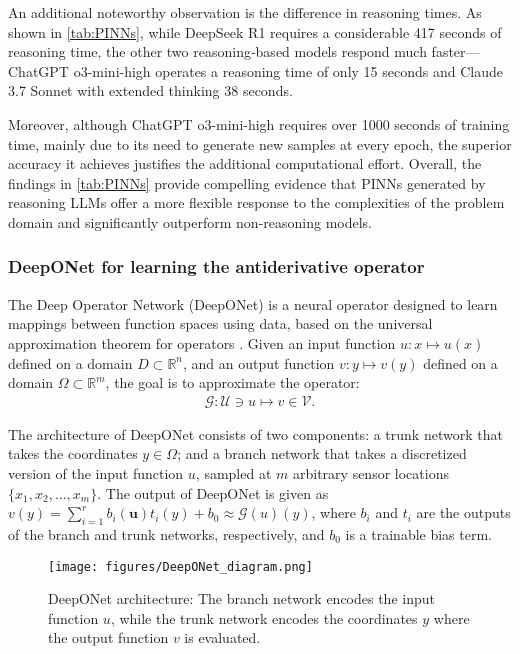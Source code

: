 \documentclass{article}
\begin{document}
An additional noteworthy observation is the difference in reasoning times. As shown in \autoref{tab:PINNs}, while DeepSeek R1 requires a considerable 417 seconds of reasoning time, the other two reasoning‐based models respond much faster—ChatGPT o3-mini-high operates a reasoning time of only 15 seconds and Claude 3.7 Sonnet with extended thinking 38 seconds. 

Moreover, although ChatGPT o3-mini-high requires over 1000 seconds of training time, mainly due to its need to generate new samples at every epoch, the superior accuracy it achieves justifies the additional computational effort. Overall, the findings in \autoref{tab:PINNs} provide compelling evidence that PINNs generated by reasoning LLMs offer a more flexible response to the complexities of the problem domain and significantly outperform non-reasoning models.



\subsubsection{DeepONet for learning the antiderivative operator}

The Deep Operator Network (DeepONet) \cite{deeponet} is a neural operator designed to learn mappings between function spaces using data, based on the universal approximation theorem for operators \cite{chen_universal_thm_neural_operator}. Given an input function $ u: x \mapsto u(x) $ defined on a domain $ D \subset \mathbb{R}^n $, and an output function $ v: y \mapsto v(y) $ defined on a domain $ \Omega \subset \mathbb{R}^m $, the goal is to approximate the operator:
\begin{align*}
    \mathcal{G}: \mathcal{U} \ni u \mapsto v \in \mathcal{V}.
\end{align*}

The architecture of DeepONet consists of two components: a trunk network that takes the coordinates $ y \in \Omega $; and a branch network that takes a discretized version of the input function $ u $, sampled at $ m $ arbitrary sensor locations $ \{x_1, x_2, \dots, x_m\} $. The output of DeepONet is given as $v(y) = \sum_{i = 1}^r b_i(\boldsymbol{u}) t_i(y) + b_0 \approx \mathcal{G}(u)(y) $, where $ b_i $ and $ t_i $ are the outputs of the branch and trunk networks, respectively, and $ b_0 $ is a trainable bias term. 

\begin{figure}[h!]
    \centering
    \texttt{[image: figures/DeepONet\_diagram.png]}
    \caption{DeepONet architecture: The branch network encodes the input function $ u $, while the trunk network encodes the coordinates $ y $ where the output function $ v $ is evaluated.}
    \label{fig:deepONet_diagram}
\end{figure}
\end{document}
